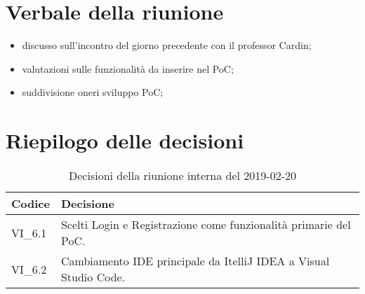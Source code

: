 \section{Verbale della riunione}
\begin{itemize}
	\item discusso sull'incontro del giorno precedente con il professor Cardin;
	\item valutazioni sulle funzionalità da inserire nel PoC;
	\item suddivisione oneri sviluppo PoC;
\end{itemize}

\hspace{3cm}

\section{Riepilogo delle decisioni}

	
	\begin{longtable}{ >{\centering}p{} >{}p{}}
		\caption{Decisioni della riunione interna del 2019-02-20}\\	
		\rowcolorhead
		\textbf{\color{white}Codice} 
		& \centering\textbf{\color{white}Decisione} 
		\tabularnewline 
		\endfirsthead
		VI\_6.1 & Scelti Login e Registrazione come funzionalità primarie del 
		PoC.
		
		\tabularnewline 
		VI\_6.2 & Cambiamento IDE principale da ItelliJ IDEA a Visual Studio 
		Code.
		
		
		
		
	\end{longtable}
	




